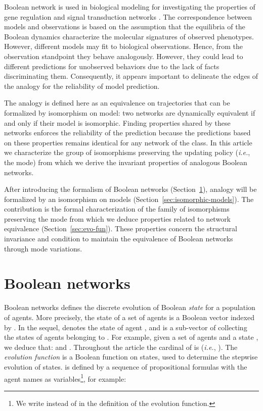 \documentclass[12pt]{elsarticle}
\newcommand{\abbrev}[1]{#1, \relax}
\newcommand{\ie}[0]{\abbrev{\textit{i.e.}}}
\begin{document}
Boolean network is used in biological modeling for investigating the properties of gene regulation and signal transduction networks \cite{Thomas1991,Garg2007, Demongeot2010, Delaplace2010}. The correspondence between models and observations is based on the assumption that the equilibria of the Boolean dynamics characterize the molecular signatures of observed phenotypes.  However, different models may fit to biological observations. Hence, from the observation standpoint they behave analogously. However,  they  could lead to different predictions for unobserved behaviors due to the lack of facts discriminating them. Consequently, it appears important to delineate the edges of the analogy for the reliability of model prediction.  

The analogy is defined here as an equivalence on trajectories that can be formalized by isomorphism on model: two networks are dynamically equivalent if and only if their model is isomorphic. Finding properties shared by these networks enforces the reliability of the prediction  because the predictions based on these properties remains identical for any network of the class. In this article we characterize the group of isomorphisms preserving the updating policy (\ie the mode) from which we derive the invariant properties of analogous Boolean networks. 

After introducing the formalism of Boolean networks (Section~\ref{sec:discrete-dynamics}), analogy will be formalized by an isomorphism on models (Section~\ref{sec:isomorphic-models}). The contribution is the formal characterization of the family of isomorphisms preserving the mode from which we deduce properties related to network equivalence (Section~\ref{sec:evo-fun}). These properties concern the structural invariance and condition to maintain the equivalence of Boolean networks through mode variations.

\section{Boolean networks}
\label{sec:discrete-dynamics}
Boolean networks defines the discrete evolution of Boolean \emph{state} for a population of agents. More precisely, the state of a set of agents  is a Boolean vector  indexed by . In the sequel,  denotes the state of agent , and  is a sub-vector of  collecting the states of agents belonging to . For example, given a set of agents  and a state , we deduce that:  and . Throughout the article the cardinal of  is  (\ie ). The \emph{ evolution function} is a Boolean function on states,  used to determine the stepwise evolution of states.  is  defined by a sequence of propositional formulas with the agent names as variables\footnote{We write  instead of  in the definition of the evolution function.}, for example:
\end{document}
